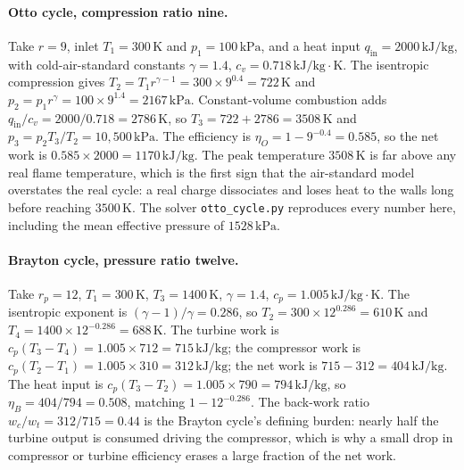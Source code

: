 \paragraph{Otto cycle, compression ratio nine.} Take $r = 9$, inlet
$T_1 = 300\,\si{\kelvin}$ and $p_1 = 100\,\text{kPa}$, and a heat input
$q_{\text{in}} = 2000\,\text{kJ}/\text{kg}$, with cold-air-standard
constants $\gamma = 1.4$, $c_v = 0.718\,\text{kJ}/\text{kg}\cdot\text{K}$.
The isentropic compression gives $T_2 = T_1 r^{\gamma-1} =
300 \times 9^{0.4} = 722\,\si{\kelvin}$ and $p_2 = p_1 r^\gamma =
100 \times 9^{1.4} = 2167\,\text{kPa}$. Constant-volume combustion adds
$q_{\text{in}}/c_v = 2000/0.718 = 2786\,\si{\kelvin}$, so $T_3 = 722 +
2786 = 3508\,\si{\kelvin}$ and $p_3 = p_2 T_3/T_2 = 10{,}500\,\text{kPa}$.
The efficiency is $\eta_O = 1 - 9^{-0.4} = 0.585$, so the net work is
$0.585 \times 2000 = 1170\,\text{kJ}/\text{kg}$. The peak temperature
$3508\,\si{\kelvin}$ is far above any real flame temperature, which is
the first sign that the air-standard model overstates the real cycle: a
real charge dissociates and loses heat to the walls long before reaching
$3500\,\si{\kelvin}$. The solver \texttt{otto\_cycle.py} reproduces every
number here, including the mean effective pressure of $1528\,\text{kPa}$.

\paragraph{Brayton cycle, pressure ratio twelve.} Take $r_p = 12$,
$T_1 = 300\,\si{\kelvin}$, $T_3 = 1400\,\si{\kelvin}$, $\gamma = 1.4$,
$c_p = 1.005\,\text{kJ}/\text{kg}\cdot\text{K}$. The isentropic
exponent is $(\gamma-1)/\gamma = 0.286$, so $T_2 = 300 \times 12^{0.286}
= 610\,\si{\kelvin}$ and $T_4 = 1400 \times 12^{-0.286} = 688\,\si{
\kelvin}$. The turbine work is $c_p(T_3 - T_4) = 1.005 \times 712 =
715\,\text{kJ}/\text{kg}$; the compressor work is $c_p(T_2 - T_1) =
1.005 \times 310 = 312\,\text{kJ}/\text{kg}$; the net work is
$715 - 312 = 404\,\text{kJ}/\text{kg}$. The heat input is $c_p(T_3 -
T_2) = 1.005 \times 790 = 794\,\text{kJ}/\text{kg}$, so $\eta_B =
404/794 = 0.508$, matching $1 - 12^{-0.286}$. The back-work ratio
$w_c/w_t = 312/715 = 0.44$ is the Brayton cycle's defining burden:
nearly half the turbine output is consumed driving the compressor,
which is why a small drop in compressor or turbine efficiency erases a
large fraction of the net work.

